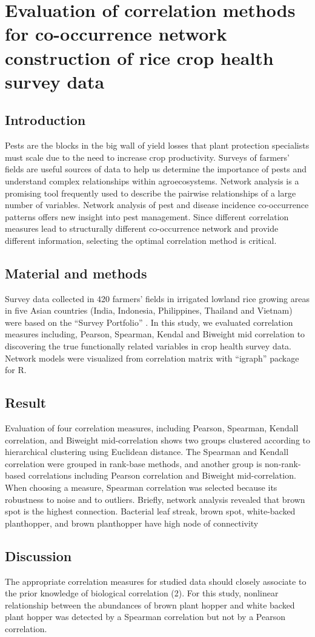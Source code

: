 \section{Evaluation of correlation methods for co-occurrence network construction of rice crop health survey data}
\subsection{Introduction}

Pests are the blocks in the big wall of yield losses that plant protection specialists must scale due to the need to increase crop productivity. Surveys of farmers’ fields are useful sources of data to help us determine the importance of pests and understand complex relationships within agroecosystems. Network analysis is a promising tool frequently used to describe the pairwise relationships of a large number of variables. Network analysis of pest and disease incidence co-occurrence patterns offers new insight into pest management. Since different correlation measures lead to structurally different co-occurrence network and provide different information, selecting the optimal correlation method is critical. 

\subsection{Material and methods}
Survey data collected in 420 farmers’ fields in irrigated lowland rice growing areas in five Asian countries (India, Indonesia, Philippines, Thailand and Vietnam) were based on the “Survey Portfolio” . In this study, we evaluated correlation measures including, Pearson, Spearman, Kendal and Biweight mid correlation to discovering the true functionally related variables in crop health survey data.
Network models were visualized from correlation matrix with “igraph” package for R. 

\subsection{Result}
Evaluation of four correlation measures, including Pearson, Spearman, Kendall correlation, and Biweight mid-correlation shows two groups clustered according to hierarchical clustering using Euclidean distance. The Spearman and Kendall correlation were grouped in rank-base methods, and another group is non-rank-based correlations including Pearson correlation and Biweight mid-correlation. When choosing a measure, Spearman correlation was selected because its robustness to noise and to outliers.
Briefly, network analysis revealed that brown spot is the highest connection. Bacterial leaf streak, brown spot, white-backed planthopper, and brown planthopper have high node of connectivity

\subsection{Discussion}
The appropriate correlation measures for studied data should closely associate to the prior knowledge of biological correlation (2). For this study, nonlinear relationship between the abundances of brown plant hopper and white backed plant hopper was detected by a Spearman correlation but not by a Pearson correlation.
